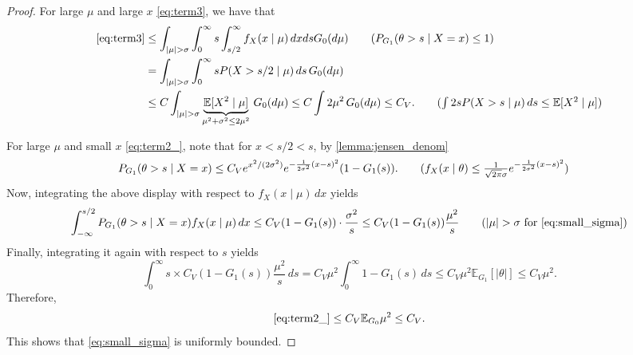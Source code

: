 \documentclass[10pt,a4paper]{amsart}
\newcommand{\E}{\mathbb{E}}
\begin{document}
\begin{proof}
For large $\mu$ and large $x$ \eqref{eq:term3}, we have that
\begin{align*}
\eqref{eq:term3} &\le \int_{|\mu| > \sigma} \int_0^\infty s \int_{s/2}^{\infty} f_X(x\mid
\mu) \,dx ds G_0(d\mu) \tag{$P_{G_1}
(\theta > s
\mid X=x) \le 1$}\\
&= \int_{|\mu| > \sigma} \int_0^\infty s P(X > s/2 \mid \mu)\,ds \,G_0(d\mu) \\ 
&\le C\int_{|\mu| > \sigma} \underbrace{\E[X^2 \mid \mu]}_{\mu^2 + \sigma^2 \le
2\mu^2}\, G_0(d\mu)  \le C \int
2\mu^2
\,G_0(d\mu) \le C_{V}.\tag{$\int 2sP(X > s \mid \mu)\,ds \le \E[X^2 \mid \mu]$}
\end{align*}

For large $\mu$ and small $x$ \eqref{eq:term2_}, note that for $x < s/2< s$, by 
\cref{lemma:jensen_denom}
\begin{align*}
P_{G_1}(\theta > s \mid X=x) &\le C_{V} e^{x^2/(2\sigma^2)} e^{-\frac{1}{2\sigma^2}(x-s)^2}
(1-G_1(s)). \tag{$f_X(x\mid \theta) \le \frac{1}{\sqrt{2\pi} \sigma} e^{-\frac{1}
{2\sigma^2} (x-s)^2}$}
\end{align*}
Now, integrating the above display with respect to $f_X(x\mid \mu)\,dx$ yields \[
 \int_{-\infty}^{s/2}P_{G_1}
(\theta > s
\mid X=x) f_X(x\mid \mu) \,dx \le C_{V}(1-G_1(s)) \cdot \frac{\sigma^2}{s} \le 
C_{V}(1-G_1(s)) \frac{\mu^2} {s} \tag{$|\mu| > \sigma$ for \eqref{eq:small_sigma}}
\]
Finally, integrating it again with respect to $s$ yields \[
\int_0^\infty s \times C_{V}(1-G_1(s)) \frac{\mu^2} {s} \,ds = C_V \mu^2 \int_{0}^\infty
1-G_1(s)\,ds \le C_V \mu^2 \E_{G_1}[|\theta|] \le C_V \mu^2.
\]
Therefore, \[
\eqref{eq:term2_} \le  C_V \E_{G_0}\mu^2 \le C_V.
\]
This shows that \eqref{eq:small_sigma} is uniformly bounded. 



\end{proof}
\end{document}
